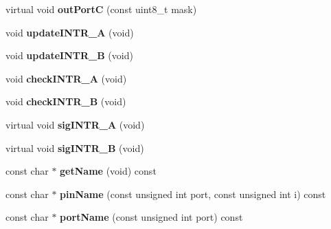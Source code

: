 \begin{DoxyCompactItemize}
\item 
\hypertarget{classIntel8255_afaff12790fc1b0cf538c7b1a4f27d804}{virtual void {\bfseries out\-Port\-C} (const uint8\-\_\-t mask)}\label{classIntel8255_afaff12790fc1b0cf538c7b1a4f27d804}

\item 
\hypertarget{classIntel8255_a862582a9f1779bb8af99365361b63c03}{void {\bfseries update\-I\-N\-T\-R\-\_\-\-A} (void)}\label{classIntel8255_a862582a9f1779bb8af99365361b63c03}

\item 
\hypertarget{classIntel8255_ad2adbe70f430d36a9f4f27124de3335d}{void {\bfseries update\-I\-N\-T\-R\-\_\-\-B} (void)}\label{classIntel8255_ad2adbe70f430d36a9f4f27124de3335d}

\item 
\hypertarget{classIntel8255_a5a0199f3c744cd05b81936aaf58dc394}{void {\bfseries check\-I\-N\-T\-R\-\_\-\-A} (void)}\label{classIntel8255_a5a0199f3c744cd05b81936aaf58dc394}

\item 
\hypertarget{classIntel8255_aa1fb90bb0a5ecf6121e8f79eb7b757d8}{void {\bfseries check\-I\-N\-T\-R\-\_\-\-B} (void)}\label{classIntel8255_aa1fb90bb0a5ecf6121e8f79eb7b757d8}

\item 
\hypertarget{classIntel8255_a2338b0324884d4362c516631dd838466}{virtual void {\bfseries sig\-I\-N\-T\-R\-\_\-\-A} (void)}\label{classIntel8255_a2338b0324884d4362c516631dd838466}

\item 
\hypertarget{classIntel8255_a6d81c4a61f0cc7033e1da1a16cc2275e}{virtual void {\bfseries sig\-I\-N\-T\-R\-\_\-\-B} (void)}\label{classIntel8255_a6d81c4a61f0cc7033e1da1a16cc2275e}

\item 
\hypertarget{classIntel8255_a74f2c86ed0256d9d51ee468bc156b004}{const char $\ast$ {\bfseries get\-Name} (void) const }\label{classIntel8255_a74f2c86ed0256d9d51ee468bc156b004}

\item 
\hypertarget{classIntel8255_ab229c3b40dbb7fdf4304b82cd40696fa}{const char $\ast$ {\bfseries pin\-Name} (const unsigned int port, const unsigned int i) const }\label{classIntel8255_ab229c3b40dbb7fdf4304b82cd40696fa}

\item 
\hypertarget{classIntel8255_a3f2f6c30bb6cb840cac73d4a83414481}{const char $\ast$ {\bfseries port\-Name} (const unsigned int port) const }\label{classIntel8255_a3f2f6c30bb6cb840cac73d4a83414481}

\end{DoxyCompactItemize}
